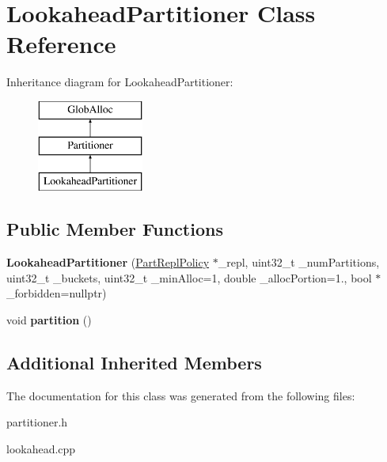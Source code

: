 \hypertarget{classLookaheadPartitioner}{\section{Lookahead\-Partitioner Class Reference}
\label{classLookaheadPartitioner}
}
Inheritance diagram for Lookahead\-Partitioner\-:\begin{figure}[H]
\begin{center}
\leavevmode
\includegraphics[height=3.000000cm]{classLookaheadPartitioner}
\end{center}
\end{figure}
\subsection*{Public Member Functions}
\begin{DoxyCompactItemize}
\item 
\hypertarget{classLookaheadPartitioner_a6f9409d5526f47560f6de4769911b97c}{{\bfseries Lookahead\-Partitioner} (\hyperlink{classPartReplPolicy}{Part\-Repl\-Policy} $\ast$\-\_\-repl, uint32\-\_\-t \-\_\-num\-Partitions, uint32\-\_\-t \-\_\-buckets, uint32\-\_\-t \-\_\-min\-Alloc=1, double \-\_\-alloc\-Portion=1., bool $\ast$\-\_\-forbidden=nullptr)}\label{classLookaheadPartitioner_a6f9409d5526f47560f6de4769911b97c}

\item 
\hypertarget{classLookaheadPartitioner_a205ac8b11251aea1baaf90f1399d33f3}{void {\bfseries partition} ()}\label{classLookaheadPartitioner_a205ac8b11251aea1baaf90f1399d33f3}

\end{DoxyCompactItemize}
\subsection*{Additional Inherited Members}


The documentation for this class was generated from the following files\-:\begin{DoxyCompactItemize}
\item 
partitioner.\-h\item 
lookahead.\-cpp\end{DoxyCompactItemize}
